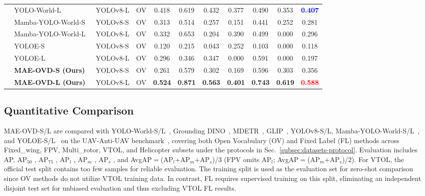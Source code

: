 \documentclass[letterpaper, 10 pt, conference]{ieeeconf}  %
\begin{document}
\begin{table}[!p]
\begin{tabular}{l|lll|cccccc|c}
 & YOLO-World-L~\cite{cheng2024yoloworld} & YOLOv8-L & OV & 0.418 & 0.619 & 0.432 & 0.377 & 0.490 & 0.353 & \textbf{\textcolor{blue}{0.407}} \\
 & Mamba-YOLO-World-S~\cite{wang2025mambayoloworld} & YOLOv8-S & OV & 0.313 & 0.514 & 0.257 & 0.151 & 0.441 & 0.252 & 0.281 \\
 & Mamba-YOLO-World-L~\cite{wang2025mambayoloworld} & YOLOv8-L & OV & 0.332 & 0.653 & 0.204 & 0.390 & 0.499 & 0.000 & 0.296 \\
 & YOLOE-S~\cite{wang2025yoloe} & YOLOv8-S & OV & 0.120 & 0.215 & 0.043 & 0.252 & 0.103 & 0.000 & 0.118 \\
 & YOLOE-L~\cite{wang2025yoloe} & YOLOv8-L & OV & 0.296 & 0.346 & 0.347 & 0.000 & 0.591 & 0.000 & 0.197 \\
\hhline{~----------}
\rowcolor{gray!15}\cellcolor{white} & \textbf{MAE-OVD-S (Ours)} & YOLOv8-S & OV & 0.261 & 0.579 & 0.302 & 0.169 & 0.596 & 0.303 & 0.356 \\
\rowcolor{gray!15}\cellcolor{white} & \textbf{MAE-OVD-L (Ours)} & YOLOv8-L & OV & \textbf{0.524} & \textbf{0.871} & \textbf{0.563} & \textbf{0.401} & \textbf{0.743} & \textbf{0.619} & \textbf{\textcolor{red}{0.588}} \\
\hline
\end{tabular}
\end{table}
\clearpage

\subsection{Quantitative Comparison}
\label{subsec:quantitative-protocol}

MAE-OVD-S/L are compared with YOLO-World-S/L~\cite{cheng2024yoloworld}, Grounding DINO~\cite{liu2024groundingdino}, MDETR~\cite{kamath2021mdetr}, GLIP~\cite{li2022glip}, YOLOv8-S/L, Mamba-YOLO-World-S/L~\cite{wang2025mambayoloworld}, and YOLOE-S/L~\cite{wang2025yoloe} on the UAV-Anti-UAV benchmark~\cite{zhang2025uavantiuav}, covering both Open Vocabulary (OV) and Fixed Label (FL) methods across Fixed\_wing, FPV, Multi\_rotor, VTOL, and Helicopter subsets under the protocols in Sec.~\ref{subsec:datasets-protocol}. Evaluation includes AP, AP$_{50}$  , AP$_{75}$  , AP$_l$  , AP$_m$  , AP$_s$  , and AvgAP$=$(AP$_l$+AP$_m$+AP$_s$)/$3$ (FPV omits AP$_l$; AvgAP$=$(AP$_m$+AP$_s$)/$2$). For VTOL, the official test split contains too few samples for reliable evaluation. The training split is used as the evaluation set for zero-shot comparison since OV methods do not utilize VTOL training data. In contrast, FL requires supervised training on this split, eliminating an independent disjoint test set for unbiased evaluation and thus excluding VTOL FL results.
\end{document}
